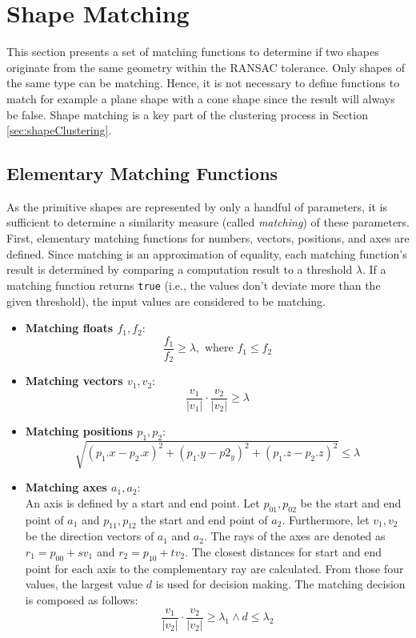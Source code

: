 \section{Shape Matching}
\label{sec:shapeMatching}

This section presents a set of matching functions to determine if two shapes originate from the same geometry within the RANSAC tolerance. Only shapes of the same type can be matching. Hence, it is not necessary to define functions to match for example a plane shape with a cone shape since the result will always be false. Shape matching is a key part of the clustering process in Section \ref{sec:shapeClustering}.


\subsection{Elementary Matching Functions}
\label{sec:elementarMatchingFuns}

As the primitive shapes are represented by only a handful of parameters, it is sufficient to determine a similarity measure (called \textit{matching}) of these parameters. First, elementary matching functions for numbers, vectors, positions, and axes are defined. Since matching is an approximation of equality, each matching function's result is determined by comparing a computation result to a threshold $\lambda$. If a matching function returns \verb|true| (i.e., the values don't deviate more than the given threshold), the input values are considered to be matching. 

\begin{itemize}
    \item \textbf{Matching floats $f_1, f_2$}: 
        $$\frac{f_1}{f_2} \geq \lambda, \textrm{ where } f_1 \leq f_2$$  
    \item \textbf{Matching vectors $v_1, v_2$}: 
        $$\frac{v_1}{|v_1|} \cdot \frac{v_2}{|v_2|} \geq \lambda$$
    \item \textbf{Matching positions $p_1, p_2$}: 
        $$\sqrt{(p_1.x - p_2.x)^2 + (p_1.y - p2_y)^2 + (p_1.z - p_2.z)^2} \leq \lambda$$
    \item \textbf{Matching axes $a_1, a_2$}: 
    \\
    An axis is defined by a start and end point. Let $p_{01},p_{02}$ be the start and end point of $a_1$ and $p_{11}, p_{12}$ the start and end point of $a_2$. Furthermore, let $v_1, v_2$ be the direction vectors of $a_1$ and $a_2$. The rays of the axes are denoted as $r_1 = p_{00} + sv_1$ and $r_2 = p_{10} + tv_2$. The closest distances for start and end point for each axis to the complementary ray are calculated. From those four values, the largest value $d$ is used for decision making. The matching decision is composed as follows: 
        $$\frac{v_1}{|v_2|} \cdot \frac{v_2}{|v_2|} \geq \lambda_1 \land d \leq \lambda_2$$
\end{itemize}


